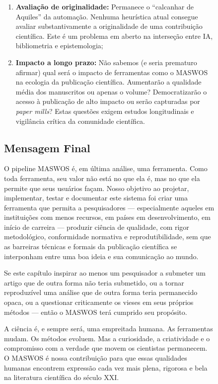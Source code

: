 \begin{figure}
\begin{enumerate}
    \item \textbf{Avaliação de originalidade:} Permanece o
    ``calcanhar de Aquiles'' da automação. Nenhuma heurística
    atual consegue avaliar substantivamente a originalidade de
    uma contribuição científica. Este é um problema em aberto
    na interseção entre IA, bibliometria e epistemologia;

    \item \textbf{Impacto a longo prazo:} Não sabemos (e seria
    prematuro afirmar) qual será o impacto de ferramentas como
    o MASWOS na ecologia da publicação científica. Aumentarão a
    qualidade média dos manuscritos ou apenas o volume?
    Democratizarão o acesso à publicação de alto impacto ou
    serão capturadas por \textit{paper mills}? Estas questões
    exigem estudos longitudinais e vigilância crítica da
    comunidade científica.
\end{enumerate}

\subsection{Mensagem Final}
\label{sec:mensagem_final}

O pipeline MASWOS é, em última análise, uma ferramenta. Como
toda ferramenta, seu valor não está no que ela é, mas no que
ela permite que seus usuários façam. Nosso objetivo ao projetar,
implementar, testar e documentar este sistema foi criar uma
ferramenta que permita a pesquisadores — especialmente aqueles
em instituições com menos recursos, em países em desenvolvimento,
em início de carreira — produzir ciência de qualidade, com rigor
metodológico, conformidade normativa e reprodutibilidade, sem que
as barreiras técnicas e formais da publicação científica se
interponham entre uma boa ideia e sua comunicação ao mundo.

Se este capítulo inspirar ao menos um pesquisador a submeter um
artigo que de outra forma não teria submetido, ou a tornar
reproduzível uma análise que de outra forma teria permanecido
opaca, ou a questionar criticamente os vieses em seus próprios
métodos — então o MASWOS terá cumprido seu propósito.

A ciência é, e sempre será, uma empreitada humana. As ferramentas
mudam. Os métodos evoluem. Mas a curiosidade, a criatividade e o
compromisso com a verdade que movem os cientistas permanecem. O
MASWOS é nossa contribuição para que essas qualidades humanas
encontrem expressão cada vez mais plena, rigorosa e bela na
literatura científica do século XXI.


\end{figure}
